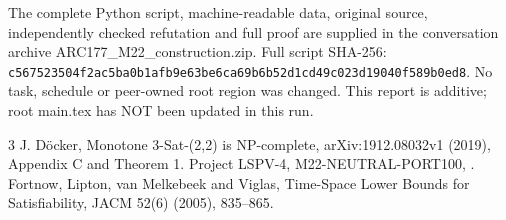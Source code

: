 \documentclass[11pt]{article}
\begin{document}
The complete Python script, machine-readable data, original source,
independently checked refutation and full proof are supplied in the
conversation archive ARC177\_M22\_construction.zip. Full script SHA-256:
\texttt{c567523504f2ac5ba0b1afb9e63be6ca69b6b52d1cd49c023d19040f589b0ed8}.
No task, schedule or peer-owned root region was changed. This report is
additive; root main.tex has NOT been updated in this run.

\begin{thebibliography}{3}
 J. D\"ocker, Monotone 3-Sat-(2,2) is NP-complete,
arXiv:1912.08032v1 (2019), Appendix C and Theorem 1.
 Project LSPV-4, M22-NEUTRAL-PORT100,
.
 Fortnow, Lipton, van Melkebeek and Viglas, Time-Space Lower
Bounds for Satisfiability, JACM 52(6) (2005), 835--865.
\end{thebibliography}
\end{document}
